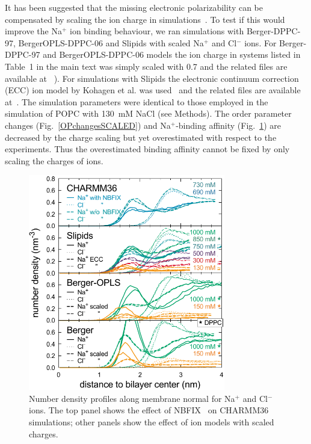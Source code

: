 \documentclass[twoside,twocolumn,9pt]{article}
\begin{document}
It has been suggested that the missing electronic polarizability 
can be compensated by scaling the ion charge in simulations~\cite{leontyev11}. 
To test if this would improve the Na$^+$ ion binding behaviour, we ran simulations with Berger-DPPC-97, BergerOPLS-DPPC-06
and Slipids with scaled Na$^+$ and Cl$^-$ ions. For Berger-DPPC-97 and BergerOPLS-DPPC-06 models 
the ion charge in systems listed in Table~1 in the main text was simply scaled with 0.7 and
the related files are available 
at ~\cite{DPPCBergerNaCl150mMscaled,DPPCBergerNaCl1000mMscaled,DPPCBergerOPLS06NaCl150mMscaled,DPPCBergerOPLS06NaCl1000mMscaled}). 
For simulations with Slipids the electronic continuum correction (ECC) ion model by Kohagen et al. was used~\cite{kohagen16} and the related files are 
available at~\cite{slipidsFILESpopcSCALED}. The simulation parameters were identical to those employed in the simulation of POPC with 130~mM NaCl (see Methods).
The order parameter changes (Fig.~\ref{OPchangesSCALED}) and Na$^+$-binding affinity (Fig.~\ref{NAdensitySCALED}) are decreased by the charge scaling but 
yet overestimated with respect to the experiments. Thus the overestimated binding affinity cannot be fixed by only scaling the charges of ions.

\begin{figure}[h]
  \centering
  \includegraphics[width=8.6cm]{../Fig/NaDensities_scaledions.pdf} 
  \caption{\label{NAdensitySCALED}
    Number density profiles along membrane normal for Na$^+$ and Cl$^-$ ions. 
    The top panel shows the effect of NBFIX~\cite{venable13} on CHARMM36 simulations;
    other panels show the effect of ion models with scaled charges.
}
\end{figure}
\end{document}

